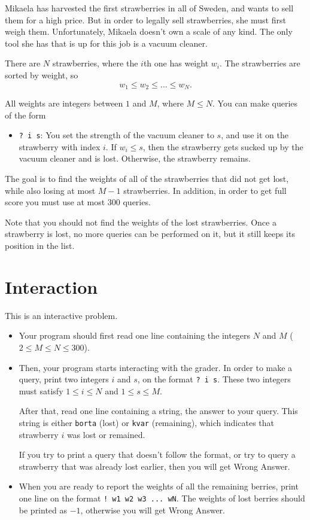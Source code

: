 

Mikaela has harvested the first strawberries in all of Sweden, and wants to sell them for 
a high price. But in order to legally sell strawberries, she must first weigh them.
Unfortunately, Mikaela doesn't own a scale of any kind. The only tool she has that is up 
for this job is a vacuum cleaner.

There are $N$ strawberries, where the $i$th one has weight $w_i$. The strawberries are sorted by weight, 
so 
$$w_1 \leq w_2 \leq \dots \leq w_N.$$ 

All weights are integers between $1$ and $M$, where $M \leq N$. You can make queries of the form
\begin{itemize}
    \item \verb|? i s|: You set the strength of the vacuum cleaner to $s$, and use
    it on the strawberry with index $i$. If $w_i \leq s$, then the strawberry
    gets sucked up by the vacuum cleaner and is lost. Otherwise, the strawberry remains.
\end{itemize}

The goal is to find the weights of all of the strawberries that did not get lost, while also losing 
at most $M-1$ strawberries. In addition, in order to get full score you must use at most $300$ queries.

Note that you should not find the weights of the lost strawberries. Once a strawberry is lost, no more 
queries can be performed on it, but it still keeps its position in the list.

\section*{Interaction}

This is an interactive problem.
\begin{itemize}
    \item Your program should first read one line containing the integers $N$ and $M$ ($2 \leq M \leq N \leq 300$).
    \item Then, your program starts interacting with the grader. In order to make a query, print two integers $i$ and 
    $s$, on the format \verb|? i s|. These two integers must satisfy $1 \leq i \leq N$ and $1 \leq s \leq M$.

    After that, read one line containing a string, the answer to your query. This string is either \verb|borta| (lost)
    or \verb|kvar| (remaining), which indicates that strawberry $i$ was lost or remained. 

    If you try to print a query that doesn't follow the format, or try to query a strawberry that was already lost earlier,
    then you will get Wrong Answer.

    \item When you are ready to report the weights of all the remaining berries, print one line on the format \verb|! w1 w2 w3 ... wN|.
    The weights of lost berries should be printed as $-1$, otherwise you will get Wrong Answer.
\end{itemize}

